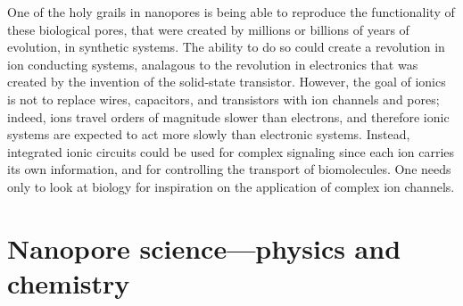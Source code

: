 			One of the holy grails in nanopores is being able to reproduce the functionality of these biological pores, that were created by millions or billions of years of evolution, in synthetic systems. The ability to do so could create a revolution in ion conducting systems, analagous to the revolution in electronics that was created by the invention of the solid-state transistor. However, the goal of ionics is not to replace wires, capacitors, and transistors with ion channels and pores; indeed, ions travel orders of magnitude slower than electrons, and therefore ionic systems are expected to act more slowly than electronic systems. Instead, integrated ionic circuits could be used for complex signaling since each ion carries its own information, and for controlling the transport of biomolecules. One needs only to look at biology for inspiration on the application of complex ion channels.

	\section{Nanopore science---physics and chemistry}

